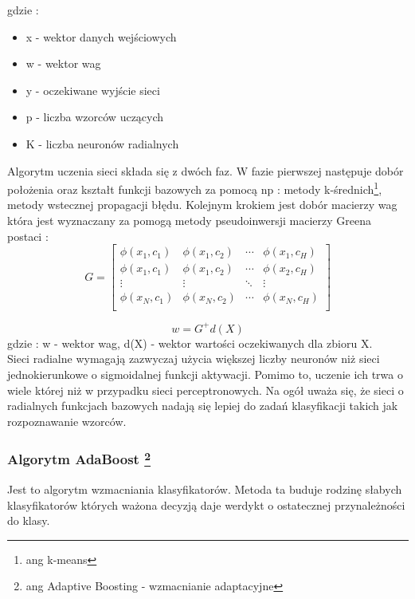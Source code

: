 \documentclass{classrep}
\begin{document}
gdzie :
\begin{itemize}
\item x - wektor danych wejściowych
\item w - wektor wag
\item y - oczekiwane wyjście sieci
\item p - liczba wzorców uczących
\item K - liczba neuronów radialnych
\end{itemize}
Algorytm uczenia sieci składa się z dwóch faz. W fazie pierwszej następuje dobór położenia oraz kształt funkcji bazowych za pomocą np : metody k-średnich\footnote{ang k-means}, metody wstecznej propagacji błędu. Kolejnym krokiem jest dobór macierzy wag która jest wyznaczany za pomogą metody pseudoinwersji macierzy Greena postaci :
\[

G =
\begin{bmatrix}
        \phi (x_1,c_1) & \phi (x_1,c_2) & \cdots  & \phi (x_1,c_H)\\
        \phi (x_1,c_1) & \phi (x_1,c_2) & \cdots  & \phi (x_2,c_H)\\
        \vdots & \vdots & \ddots  & \vdots \\
        \phi (x_N,c_1) & \phi (x_N,c_2) & \cdots  & \phi (x_N,c_H)\\
\end{bmatrix}
\]

\begin{equation}
w = G^{+}d(X)
\end{equation}
gdzie : w - wektor wag, d(X) - wektor wartości oczekiwanych dla zbioru X.\\

Sieci radialne wymagają zazwyczaj użycia większej liczby neuronów niż sieci jednokierunkowe o sigmoidalnej funkcji aktywacji. Pomimo to, uczenie ich trwa o wiele której niż w przypadku sieci perceptronowych. Na ogół uważa się, że sieci o radialnych funkcjach bazowych nadają się lepiej do zadań klasyfikacji takich jak rozpoznawanie wzorców. 




\subsubsection{Algorytm AdaBoost \footnote{ ang Adaptive Boosting - wzmacnianie adaptacyjne} }
\label{AdaBoostSec}
Jest to algorytm wzmacniania klasyfikatorów. Metoda ta buduje rodzinę słabych klasyfikatorów których ważona decyzją daje werdykt o ostatecznej przynależności do klasy. 
\end{document}
